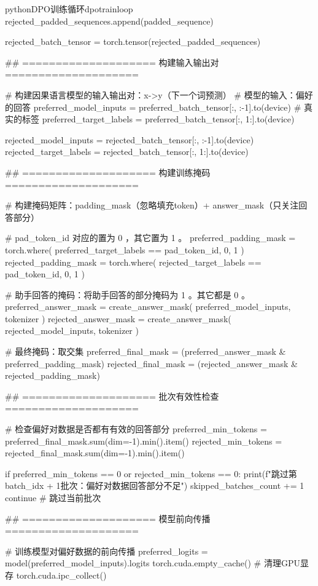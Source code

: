 \documentclass[lang=cn,newtx,10pt,scheme=chinese]{elegantbook}
\begin{document}
\begin{codebox}{python}{DPO训练循环}{dpotrainloop}
        rejected_padded_sequences.append(padded_sequence)
    
    rejected_batch_tensor = torch.tensor(rejected_padded_sequences)

    ## ==================== 构建输入输出对 ====================
    
    # 构建因果语言模型的输入输出对：x->y（下一个词预测）
    # 模型的输入：偏好的回答
    preferred_model_inputs = preferred_batch_tensor[:, :-1].to(device)
    # 真实的标签
    preferred_target_labels = preferred_batch_tensor[:, 1:].to(device)
    
    rejected_model_inputs = rejected_batch_tensor[:, :-1].to(device)
    rejected_target_labels = rejected_batch_tensor[:, 1:].to(device)

    ## ==================== 构建训练掩码 ====================
    
    # 构建掩码矩阵：padding_mask（忽略填充token）+ answer_mask（只关注回答部分）
    
    # pad_token_id 对应的置为 0 ，其它置为 1 。
    preferred_padding_mask = torch.where(
        preferred_target_labels == pad_token_id,
        0,
        1
    )
    rejected_padding_mask = torch.where(
        rejected_target_labels == pad_token_id,
        0,
        1
    )
    
    # 助手回答的掩码：将助手回答的部分掩码为 1 。其它都是 0 。
    preferred_answer_mask = create_answer_mask(
        preferred_model_inputs,
        tokenizer
    )
    rejected_answer_mask = create_answer_mask(
        rejected_model_inputs,
        tokenizer
    )
    
    # 最终掩码：取交集
    preferred_final_mask = (preferred_answer_mask & preferred_padding_mask)
    rejected_final_mask = (rejected_answer_mask & rejected_padding_mask)

    ## ==================== 批次有效性检查 ====================
    
    # 检查偏好对数据是否都有有效的回答部分
    preferred_min_tokens = preferred_final_mask.sum(dim=-1).min().item()
    rejected_min_tokens = rejected_final_mask.sum(dim=-1).min().item()
    
    if preferred_min_tokens == 0 or rejected_min_tokens == 0:
        print(f"跳过第{batch_idx + 1}批次：偏好对数据回答部分不足")
        skipped_batches_count += 1
        continue  # 跳过当前批次

    ## ==================== 模型前向传播 ====================
    
    # 训练模型对偏好数据的前向传播
    preferred_logits = model(preferred_model_inputs).logits
    torch.cuda.empty_cache()  # 清理GPU显存
    torch.cuda.ipc_collect()


\end{codebox}
\end{document}
